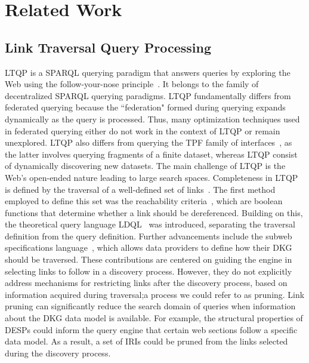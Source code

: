 \section{Related Work}\label{sec:related_work}

\subsection{Link Traversal Query Processing}
LTQP is a SPARQL querying paradigm that answers queries by exploring the Web using the follow-your-nose principle~\cite{hartig2016walking}.
It belongs to the family of decentralized SPARQL querying paradigms.
LTQP fundamentally differs from federated querying because the ``federation" formed during querying expands dynamically as the query is processed.
Thus, many optimization techniques used in federated querying either do not work in the context of LTQP or remain unexplored.
LTQP also differs from querying the TPF family of interfaces~\cite{azzam2020smart,azzam2021wisekg, DBLP:journals/corr/HartigA16}, as the latter involves querying fragments of a finite dataset, whereas LTQP consist of dynamically discovering new datasets.
The main challenge of LTQP is the Web's open-ended nature leading to large search spaces.
Completeness in LTQP is defined by the traversal of a well-defined set of links~\cite{Hartig2012}.
The first method employed to define this set was the reachability criteria~\cite{Hartig2012}, which are boolean functions that determine whether a link should be dereferenced.
Building on this, the theoretical query language LDQL~\cite{hartigLDQL} was introduced, separating the traversal definition from the query definition.
Further advancements include the subweb specifications language~\cite{Bogaerts2021LinkTW}, which allows data providers to define how their DKG should be traversed.
These contributions are centered on guiding the engine in selecting links to follow in a discovery process.
However, they do not explicitly address mechanisms for restricting links after the discovery process, based on information acquired during traversal;a process we could refer to as pruning.
Link pruning can significantly reduce the search domain of queries when information about the DKG data model is available.
For example, the structural properties of DESPs could inform the query engine that certain web sections follow a specific data model. 
As a result, a set of IRIs could be pruned from the links selected during the discovery process.

